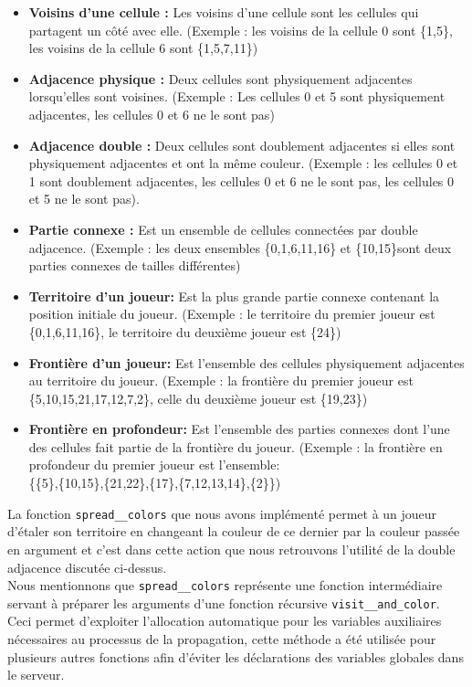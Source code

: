 \documentclass[11pt]{article}
\begin{document}
\begin{itemize}
    \item \textbf{Voisins d'une cellule :} Les voisins d'une cellule sont les cellules qui partagent un côté avec elle. (Exemple : les voisins de la cellule 0 sont \{1,5\}, les voisins de la cellule 6 sont \{1,5,7,11\})
    \item \textbf{Adjacence physique :} Deux cellules sont physiquement adjacentes lorsqu'elles sont voisines. (Exemple : Les cellules 0 et 5 sont physiquement adjacentes, les cellules 0 et 6 ne le sont pas)
    \item \textbf{Adjacence double :} Deux cellules sont doublement adjacentes si elles sont physiquement adjacentes et ont la même couleur. (Exemple : les cellules 0 et 1 sont doublement adjacentes, les cellules 0 et 6 ne le sont pas, les cellules 0 et 5 ne le sont pas). 
    \item \textbf{Partie connexe :} Est un ensemble de cellules connectées par double adjacence. (Exemple : les deux ensembles \{0,1,6,11,16\} et \{10,15\}sont deux parties connexes de tailles différentes)
    \item \textbf{Territoire d'un joueur:} Est la plus grande partie connexe contenant la position initiale du joueur. (Exemple : le territoire du premier joueur est \{0,1,6,11,16\}, le territoire du deuxième joueur est \{24\})
    \item \textbf{Frontière d'un joueur:} Est l'ensemble des cellules physiquement adjacentes au territoire du joueur. (Exemple : la frontière du premier joueur est \{5,10,15,21,17,12,7,2\}, celle du deuxième joueur est \{19,23\})
    \item \textbf{Frontière en profondeur:} Est l'ensemble des parties connexes dont l'une des cellules fait partie de la frontière du joueur. (Exemple : la frontière en profondeur du premier joueur est l'ensemble: \\ \{\{5\},\{10,15\},\{21,22\},\{17\},\{7,12,13,14\},\{2\}\})
\end{itemize}
La fonction \texttt{spread\_\_colors} que nous avons implémenté permet à un joueur d'étaler son territoire en changeant la couleur de ce dernier par la couleur passée en argument et c'est dans cette action que nous retrouvons l'utilité de la double adjacence discutée ci-dessus.\\
Nous mentionnons que \texttt{spread\_\_colors} représente une fonction intermédiaire servant à préparer les arguments d'une fonction récursive
\texttt{visit\_\_and\_color}. Ceci permet d'exploiter l'allocation automatique pour les variables auxiliaires nécessaires au processus de la propagation, cette méthode a été utilisée pour plusieurs autres fonctions afin d'éviter les déclarations des variables globales dans le serveur.\\
\end{document}
